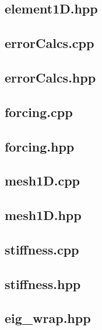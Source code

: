 \documentclass[a4paper, 12pt]{article}
\begin{document}
\subsection{element1D.hpp} \label{subsec:element1D.hpp}


\subsection{errorCalcs.cpp} \label{subsec:errorCalcs.cpp}

\subsection{errorCalcs.hpp} \label{subsec:errorCalcs.hpp}


\subsection{forcing.cpp} \label{subsec:forcing.cpp}

\subsection{forcing.hpp} \label{subsec:forcing.hpp}


\subsection{mesh1D.cpp} \label{subsec:mesh1D.cpp}

\subsection{mesh1D.hpp} \label{subsec:mesh1D.hpp}


\subsection{stiffness.cpp} \label{subsec:stiffness.cpp}

\subsection{stiffness.hpp} \label{subsec:stiffness.hpp}


\subsection{eig\_wrap.hpp} \label{subsec:eig_wrap.hpp}

\end{document}
